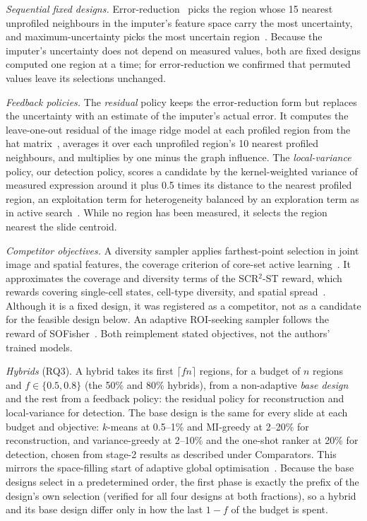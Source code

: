 \documentclass[10pt]{article}
\begin{document}
\emph{Sequential fixed designs.} Error-reduction~\citep{roy2001toward} picks the region whose 15 nearest
unprofiled neighbours in the imputer's feature space carry the most uncertainty, and maximum-uncertainty picks the
most uncertain region~\citep{lewis1994sequential}. Because the imputer's uncertainty does not depend on measured
values, both are fixed designs computed one region at a time; for error-reduction we confirmed that permuted values
leave its selections unchanged.

\emph{Feedback policies.} The \emph{residual} policy keeps the error-reduction form but replaces the
uncertainty with an estimate of the imputer's actual error. It computes the leave-one-out residual of the image
ridge model at each profiled region from the hat matrix~\citep{hastie2009elements}, averages it over each unprofiled
region's 10 nearest profiled neighbours, and multiplies by one minus the graph influence. The
\emph{local-variance} policy, our detection policy, scores a candidate by the kernel-weighted variance of measured
expression around it plus 0.5 times its distance to the nearest profiled region, an exploitation term for
heterogeneity balanced by an exploration term as in active search~\citep{garnett2012bayesian}. While no region has
been measured, it selects the region nearest the slide centroid.

\emph{Competitor objectives.} A diversity sampler applies farthest-point selection in joint image and spatial
features, the coverage criterion of core-set active learning~\citep{sener2018active}. It approximates the coverage
and diversity terms of the SCR$^2$-ST reward, which rewards covering single-cell states, cell-type diversity, and
spatial spread~\citep{zhu2026scr2st}. Although it is a fixed design, it was registered as a competitor, not as a
candidate for the feasible design below. An adaptive ROI-seeking sampler follows the reward of
SOFisher~\citep{li2026sofisher}. Both reimplement stated objectives, not the authors' trained models.

\emph{Hybrids} (RQ3). A hybrid takes its first $\lceil fn\rceil$ regions, for a budget of $n$ regions and
$f\in\{0.5,0.8\}$ (the 50\% and 80\% hybrids), from a non-adaptive \emph{base design} and the rest from a feedback
policy: the residual policy for reconstruction and local-variance for detection. The base design is the same for
every slide at each budget and objective: $k$-means at 0.5--1\% and MI-greedy at 2--20\% for reconstruction, and
variance-greedy at 2--10\% and the one-shot ranker at 20\% for detection, chosen from stage-2 results as described
under Comparators. This mirrors the space-filling start of adaptive global optimisation~\citep{jones1998efficient}.
Because the base designs select in a predetermined order, the first phase is exactly the prefix of the design's own
selection (verified for all four designs at both fractions), so a hybrid and its base design differ only in how the
last $1-f$ of the budget is spent.
\end{document}
